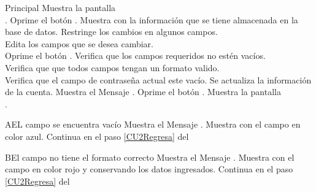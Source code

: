\begin{UCtrayectoria}{Principal}
    \UCpaso Muestra la pantalla \\.
    \UCpaso[\UCactor] Oprime el botón .
    \UCpaso Muestra  con la información que se tiene almacenada en la base de datos.
    \UCpaso Restringe los cambios en algunos campos.
        \\
    \UCpaso[\UCactor] Edita los campos que se desea cambiar.\label{CU2Regresa}
    	\\ 
	\UCpaso[\UCactor] Oprime el botón . 
	\UCpaso Verifica que los campos requeridos no estén vacíos.
	    \\
	\UCpaso Verifica que que todos campos tengan un formato valido.
	    \\
	\UCpaso Verifica que el campo de contraseña actual este vacío.
	\UCpaso Se actualiza la información de la cuenta.  \label{CU2Regresa2}
	\UCpaso Muestra el Mensaje \textbf{}.
    \UCpaso[\UCactor] Oprime el botón .
	\UCpaso Muestra la pantalla \\.
\end{UCtrayectoria}


\begin{UCtrayectoriaA}{A}{EL campo se encuentra vacío}
	\UCpaso Muestra el Mensaje \textbf{}.
    \UCpaso Muestra  con el campo en color azul.
    \UCpaso Continua en el paso \ref{CU2Regresa} del 
\end{UCtrayectoriaA}
		
\begin{UCtrayectoriaA}{B}{El campo no tiene el formato correcto}
    \UCpaso Muestra el Mensaje \textbf{}.
    \UCpaso Muestra  con el campo en color rojo y conservando los datos ingresados.
	\UCpaso Continua en el paso \ref{CU2Regresa} del 
\end{UCtrayectoriaA}

